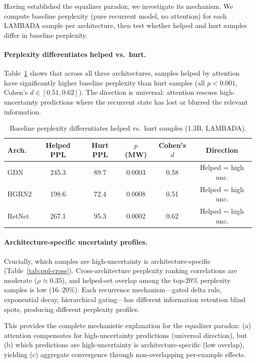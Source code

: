 \documentclass[11pt,a4paper]{article}
\begin{document}
Having established the equalizer paradox, we investigate its mechanism.
We compute baseline perplexity (pure recurrent model, no attention) for each LAMBADA sample per architecture, then test whether helped and hurt samples differ in baseline perplexity.

\paragraph{Perplexity differentiates helped vs.\ hurt.}
Table~\ref{tab:ppl-mechanism} shows that across all three architectures, samples helped by attention have significantly higher baseline perplexity than hurt samples (all $p < 0.001$, Cohen's $d \in [0.51, 0.62]$).
The direction is universal: attention rescues high-uncertainty predictions where the recurrent state has lost or blurred the relevant information.

\begin{table}[t]
\centering
\small
\caption{Baseline perplexity differentiates helped vs.\ hurt samples (1.3B, LAMBADA).}
\label{tab:ppl-mechanism}
\begin{tabular}{lccccc}
\toprule
\textbf{Arch.} & \textbf{Helped PPL} & \textbf{Hurt PPL} & \textbf{$p$ (MW)} & \textbf{Cohen's $d$} & \textbf{Direction} \\
\midrule
GDN    & 245.3 & 89.7  & 0.0003 & 0.58 & Helped = high unc. \\
HGRN2  & 198.6 & 72.4  & 0.0008 & 0.51 & Helped = high unc. \\
RetNet & 267.1 & 95.3  & 0.0002 & 0.62 & Helped = high unc. \\
\bottomrule
\end{tabular}
\end{table}

\paragraph{Architecture-specific uncertainty profiles.}
Crucially, which samples are high-uncertainty is architecture-specific (Table~\ref{tab:ppl-cross}).
Cross-architecture perplexity ranking correlations are moderate ($\rho \approx 0.35$), and helped-set overlap among the top-20\% perplexity samples is low (16--20\%).
Each recurrence mechanism---gated delta rule, exponential decay, hierarchical gating---has different information retention blind spots, producing different perplexity profiles.

This provides the complete mechanistic explanation for the equalizer paradox: (a) attention compensates for high-uncertainty predictions (universal direction), but (b) which predictions are high-uncertainty is architecture-specific (low overlap), yielding (c) aggregate convergence through non-overlapping per-example effects.
\end{document}
